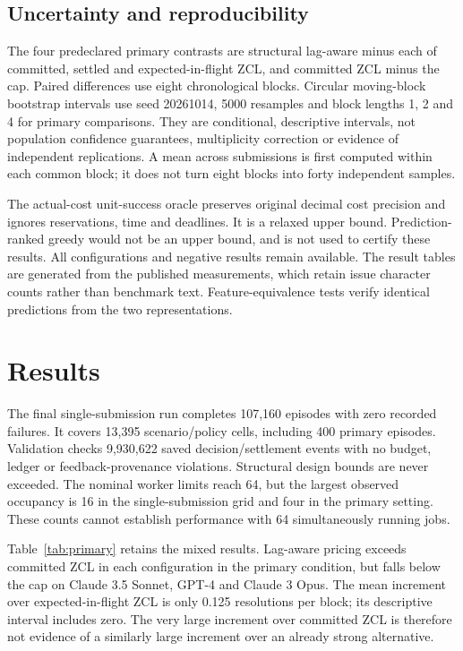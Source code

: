 \documentclass[11pt]{article}
\begin{document}
\subsection{Uncertainty and reproducibility}
The four predeclared primary contrasts are structural lag-aware minus each of committed, settled and expected-in-flight ZCL, and committed ZCL minus the cap. Paired differences use eight chronological blocks. Circular moving-block bootstrap intervals use seed 20261014, 5000 resamples and block lengths 1, 2 and 4 for primary comparisons. They are conditional, descriptive intervals, not population confidence guarantees, multiplicity correction or evidence of independent replications. A mean across submissions is first computed within each common block; it does not turn eight blocks into forty independent samples.

The actual-cost unit-success oracle preserves original decimal cost precision and ignores reservations, time and deadlines. It is a relaxed upper bound. Prediction-ranked greedy would not be an upper bound, and is not used to certify these results. All configurations and negative results remain available. The result tables are generated from the published measurements, which retain issue character counts rather than benchmark text. Feature-equivalence tests verify identical predictions from the two representations.

\section{Results}
The final single-submission run completes 107,160 episodes with zero recorded failures. It covers 13,395 scenario/policy cells, including 400 primary episodes. Validation checks 9,930,622 saved decision/settlement events with no budget, ledger or feedback-provenance violations. Structural design bounds are never exceeded. The nominal worker limits reach 64, but the largest observed occupancy is 16 in the single-submission grid and four in the primary setting. These counts cannot establish performance with 64 simultaneously running jobs.

Table~\ref{tab:primary} retains the mixed results. Lag-aware pricing exceeds committed ZCL in each configuration in the primary condition, but falls below the cap on Claude 3.5 Sonnet, GPT-4 and Claude 3 Opus. The mean increment over expected-in-flight ZCL is only 0.125 resolutions per block; its descriptive interval includes zero. The very large increment over committed ZCL is therefore not evidence of a similarly large increment over an already strong alternative.
\end{document}
